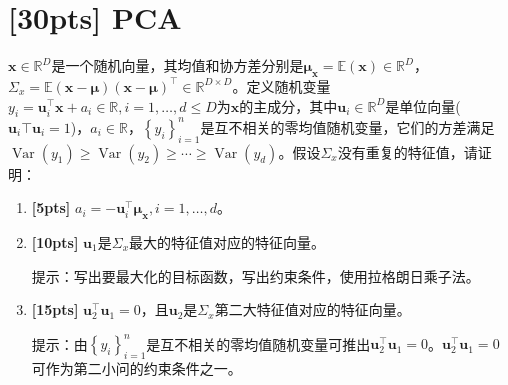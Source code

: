 \documentclass[a4paper,UTF8]{article}
\theoremstyle{definition}
\begin{document}
	\newpage

\section{[30pts] PCA}
$\boldsymbol{x} \in \mathbb{R}^{D}$是一个随机向量，其均值和协方差分别是$\boldsymbol{\mu}_{\boldsymbol{x}}=\mathbb{E}(\boldsymbol{x}) \in \mathbb{R}^{D}$，$\Sigma_{x}=\mathbb{E}(\boldsymbol{x}-\boldsymbol{\mu})(\boldsymbol{x}-\boldsymbol{\mu})^{\top} \in \mathbb{R}^{D \times D}$。定义随机变量$y_{i}=\boldsymbol{u}_{i}^{\top} \boldsymbol{x}+a_{i} \in \mathbb{R}, i=1, \ldots, d \leq D$为$\boldsymbol{x}$的主成分，其中$\boldsymbol{u}_{i} \in \mathbb{R}^{D}$是单位向量($\boldsymbol{u}_i \top \boldsymbol{u}_i = 1$)，$a_{i} \in \mathbb{R}$，$\left\{y_{i}\right\}_{i=1}^{n}$是互不相关的零均值随机变量，它们的方差满足$\operatorname{Var}\left(y_{1}\right) \geq \operatorname{Var}\left(y_{2}\right) \geq \cdots \geq \operatorname{Var}\left(y_{d}\right)$。假设$\Sigma_{x}$没有重复的特征值，请证明：
\begin{enumerate}
	\item \textbf{[5pts]} $a_{i}=-\boldsymbol{u}_{i}^{\top} \boldsymbol{\mu}_{\boldsymbol{x}}, i=1, \ldots, d$。
	\item \textbf{[10pts]} $\boldsymbol{u}_{1}$是$\Sigma_{x}$最大的特征值对应的特征向量。
	
	提示：写出要最大化的目标函数，写出约束条件，使用拉格朗日乘子法。
	
	\item \textbf{[15pts]} $\boldsymbol{u}_{2}^{\top} \boldsymbol{u}_{1}=0$，且$\boldsymbol{u}_{2}$是$\Sigma_{x}$第二大特征值对应的特征向量。
	
	提示：由$\left\{y_{i}\right\}_{i=1}^{n}$是互不相关的零均值随机变量可推出$\boldsymbol{u}_{2}^{\top} \boldsymbol{u}_{1}=0$。$\boldsymbol{u}_{2}^{\top} \boldsymbol{u}_{1}=0$ 可作为第二小问的约束条件之一。
	
\end{enumerate}
\end{document}

